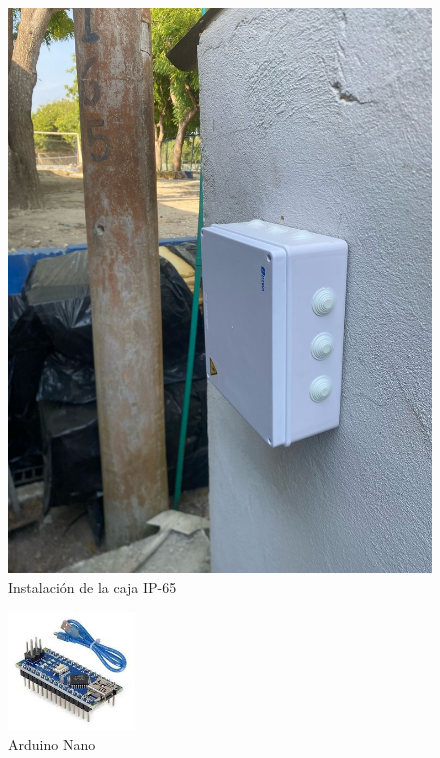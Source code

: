 \documentclass[12pt]{article}
\begin{document}
\begin{figure}[h!]
\begin{minipage}[b]{0.48\textwidth}
            \includegraphics[width=\textwidth]{imagenes/box.jpg}
            \caption{Instalación de la caja IP-65}
            \label{fig:box}
      \end{minipage}
\end{figure}


\begin{figure}[h!]
      \centering
      \includegraphics[width=0.3\textwidth]{imagenes/arduino.jpg}
      \caption{Arduino Nano}
      \label{fig:arduino}
\end{figure}
\end{document}
